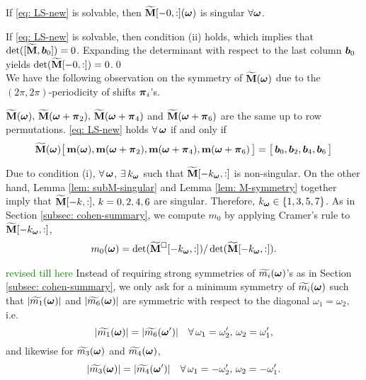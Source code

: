 \begin{lemma}\label{lem: subM-singular}
If \eqref{eq: LS-new} is solvable, then $\widetilde{\mathbf{M}}[-0,:](\boldsymbol{\omega})$ is singular $\forall \boldsymbol{\omega}$.
\end{lemma}
If \eqref{eq: LS-new} is solvable, then condition (ii) holds, which implies that $\det([\widetilde{\mathbf{M}},\boldsymbol{b}_0]) = 0$. Expanding the determinant with respect to the last column $\boldsymbol{b}_0$ yields $\det(\widetilde{\mathbf{M}}[-0,:]) = 0$.\qed\\[1em]
We have the following observation on the symmetry of $\widetilde{\mathbf{M}}(\boldsymbol{\omega})$ due to the $(2\pi,2\pi)$-periodicity of shifts $\boldsymbol{\pi}_i$'s.
\begin{lemma}\label{lem: M-symmetry}
$\widetilde{\mathbf{M}}(\boldsymbol{\omega}),\,\widetilde{\mathbf{M}}(\boldsymbol{\omega}+\boldsymbol{\pi}_2),\,\widetilde{\mathbf{M}}(\boldsymbol{\omega}+\boldsymbol{\pi}_4)$ and $\widetilde{\mathbf{M}}(\boldsymbol{\omega}+\boldsymbol{\pi}_6)$ are the same up to row permutations. \eqref{eq: LS-new} holds $\forall \, \boldsymbol{\omega}$ if and only if 
\begin{align*}
\widetilde{\mathbf{M}}(\boldsymbol{\omega}) \big[\,\mathbf{m}(\boldsymbol{\omega}),\mathbf{m}(\boldsymbol{\omega}+\boldsymbol{\pi}_2),\mathbf{m}(\boldsymbol{\omega}+\boldsymbol{\pi}_4),\mathbf{m}(\boldsymbol{\omega}+\boldsymbol{\pi}_6)\,\big] = \big[\,\boldsymbol{b}_0,\boldsymbol{b}_2,\boldsymbol{b}_4,\boldsymbol{b}_6\,\big]
\end{align*}
\end{lemma}

Due to condition (i), $\forall\,\boldsymbol{\omega}$, $\exists\, k_{\boldsymbol{\omega}}$ such that $\widetilde{\mathbf{M}}[-k_{\boldsymbol{\omega}},:]$ is non-singular. On the other hand, Lemma \ref{lem: subM-singular} and Lemma \ref{lem: M-symmetry} together imply that $\widetilde{\mathbf{M}}[-k,:],\,k=0,2,4,6$ are singular. Therefore, $k_{\boldsymbol{\omega}} \in\{1,3,5,7\}$. 
As in Section \ref{subsec: cohen-summary}, we compute $m_0$ by applying Cramer's rule to $\widetilde{\mathbf{M}}[-k_{\boldsymbol{\omega}},:]$, 
\begin{align}\label{eq: m0-cramer}
m_0(\boldsymbol{\omega}) = \det(\widetilde{\mathbf{M}}^{\Box}[-k_{\boldsymbol{\omega}},:])/\det(\widetilde{\mathbf{M}}[-k_{\boldsymbol{\omega}},:]).
\end{align}

\textcolor{green}{revised till here}
Instead of requiring strong symmetries of $\widetilde{m_{i}}(\boldsymbol{\omega})$'s as in Section \ref{subsec: cohen-summary}, we only ask for a minimum symmetry of $\widetilde{m_{i}}(\boldsymbol{\omega})$ such that $|\widetilde{m_{1}}(\boldsymbol{\omega})|$ and $|\widetilde{m_{6}}(\boldsymbol{\omega})|$ are symmetric with respect to the diagonal $\omega_1=\omega_2$, i.e.
$$ |\widetilde{m_1}(\boldsymbol{\omega})| = |\widetilde{m_6}(\boldsymbol{\omega}')|\quad \forall\, \omega_1=\omega_2', \,\omega_2=\omega_1',$$
and likewise for $\widetilde{m_{3}}(\boldsymbol{\omega})$ and $\widetilde{m_{4}}(\boldsymbol{\omega})$,
$$ |\widetilde{m_3}(\boldsymbol{\omega})| = |\widetilde{m_4}(\boldsymbol{\omega}')|\quad \forall\, \omega_1=-\omega_2', \,\omega_2=-\omega_1'.$$

